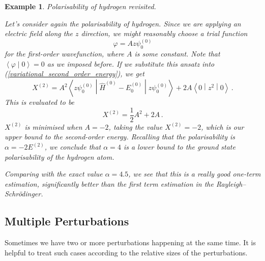 \documentclass{article}
\theoremstyle{plain}\theoremheaderfont{\normalfont\itshape}\theorembodyfont{\rmfamily}\theoremseparator{.}\newtheorem*{rem}{Remark}\newtheorem*{ex}{Example}\newtheorem*{proof}{Proof}\newtheorem*{altp}{Alternative proof}
\theoremstyle{plain}\theoremheaderfont{\normalfont\bfseries}\theorembodyfont{\rmfamily}\theoremseparator{.}\newtheorem{thm}{Theorem}[section]\newtheorem{lem}[thm]{Lemma}\newtheorem{prop}[thm]{Proposition}\newtheorem*{cor}{Corollary}\newtheorem{defn}[thm]{Definition}\newtheorem{clm}[thm]{Claim}\newtheorem{clminproof}{Claim}
\theoremstyle{break}\theoremheaderfont{\normalfont\itshape}\theorembodyfont{\rmfamily}\theoremseparator{.\medskip}\newtheorem*{proofskip}{Proof}\newtheorem*{exs}{Examples}\newtheorem*{rems}{Remarks}
\theoremstyle{break}\theoremheaderfont{\normalfont\bfseries}\theorembodyfont{\rmfamily}\theoremseparator{.\medskip}\newtheorem{lemskip}[thm]{Lemma}\newtheorem{defnskip}[thm]{Definition}\newtheorem{propskip}[thm]{Proposition}\newtheorem{thmskip}[thm]{Theorem}
\numberwithin{equation}{section}
\newcommand{\braket}[2]{\left\langle #1 \middle| #2 \right\rangle}
\newcommand{\expval}[2]{\left\langle #2 \middle| #1 \middle| #2 \right\rangle}
\begin{document}
    \begin{ex}
        \textit{Polarisability of hydrogen revisited.}

        Let's consider again the polarisability of hydrogen. Since we are applying an electric field along the \(z\) direction, we might reasonably choose a trial function
        \begin{equation}
            \varphi=Az\psi_0^{(0)}
        \end{equation}
        for the first-order wavefunction, where \(A\) is some constant. Note that \(\braket{\varphi}{0}=0\) as we imposed before. If we substitute this ansatz into (\ref{variational_second_order_energy}), we get
        \begin{equation}
            X^{(2)}=A^2\expval{\hat{H}^{(0)}-E_0^{(0)}}{z\psi_0^{(0)}}+2A\expval{z^2}{0}\,.
        \end{equation}
        This is evaluated to be
        \begin{equation}
            X^{(2)}=\frac{1}{2}A^2+2A\,.
        \end{equation}
        \(X^{(2)}\) is minimised when \(A=-2\), taking the value \(X^{(2)}=-2\), which is our upper bound to the second-order energy. Recalling that the polarisability is \(\alpha=-2E^{(2)}\), we conclude that \(\alpha=4\) is a lower bound to the ground state polarisability of the hydrogen atom.

        Comparing with the exact value \(\alpha=4.5\), we see that this is a really good one-term estimation, significantly better than the first term estimation in the Rayleigh--Schr\"{o}dinger.
    \end{ex}

    \subsection{Multiple Perturbations}
    Sometimes we have two or more perturbations happening at the same time. It is helpful to treat such cases according to the relative sizes of the perturbations.
\end{document}
